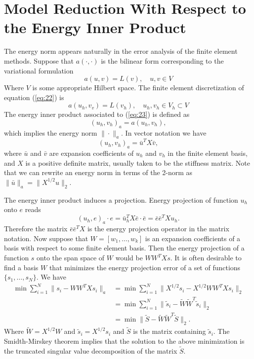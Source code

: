 \documentclass[12pt]{article}
\begin{document}
\section{Model Reduction With Respect to the Energy Inner Product}

The energy norm appears naturally in the error analysis of the finite element methods. Suppose that $a(\cdot,\cdot)$ is the bilinear form corresponding to the variational formulation
\begin{equation} \label{eq:22}
	a(u,v) = L(v), \quad u,v \in V
\end{equation}
Where $V$ is some appropriate Hilbert space. The finite element discretization of equation (\ref{eq:22}) is
\begin{equation} \label{eq:23}
	a(u_h,v_v) = L(v_h), \quad u_h,v_h\in V_h \subset V
\end{equation}
The energy inner product associated to (\ref{eq:23}) is defined as
\begin{equation} \label{eq:24}
	(u_h,v_h)_a = a(u_h,v_h),
\end{equation}
which implies the energy norm $\| \cdot \|_a$. In vector notation we have
\begin{equation} \label{eq:25}
	(u_h,v_h)_a = \bar u^T X \bar v,
\end{equation} 
where $\bar u$ and $\bar v$ are expansion coefficients of $u_h$ and $v_h$ in the finite element basis, and $X$ is a positive definite matrix, usually taken to be the stiffness matrix. Note that we can rewrite an energy norm in terms of the 2-norm as $\| \bar u \|_a = \| X^{1/2} u \|_2$.

The energy inner product induces a projection. Energy projection of function $u_h$ onto $e$ reads
\begin{equation} \label{eq:26}
	(u_h,e)_a \cdot e = \bar u_h^T X \bar e \cdot \bar e = \bar e \bar e^T X u_h. 
\end{equation}
Therefore the matrix $\bar e\bar e^T X$ is the energy projection operator in the matrix notation. Now suppose that $W = [ w_1,\dots,w_k ]$ is an expansion coefficients of a basis with respect to some finite element basis. Then the energy projection of a function $s$ onto the span space of $W$ would be $WW^TXs$. It is often desirable to find a basis $W$ that minimizes the energy projection error of a set of functions $\{s_1,\dots,s_N\}$. We have
\begin{equation} \label{eq:27}
\begin{aligned}
	\min \sum_{i=1}^N \| s_i - WW^TXs_i \|_a &= \min \sum_{i=1}^N \| X^{1/2} s_i - X^{1/2 }WW^TXs_i \|_2 \\
	&= \min \sum_{i=1}^N \| \tilde s_i - \tilde W \tilde W^T\tilde s_i \|_2 \\
	&= \min \| \tilde S - \tilde W \tilde W^T \tilde S \|_2.
\end{aligned}
\end{equation}
Where $\tilde W = X^{1/2} W$ and $\tilde s_i = X^{1/2} s_i$ and $\tilde S$ is the matrix containing $\tilde s_i$. The Smidth-Mirskey theorem implies that the solution to the above minimization is the truncated singular value decomposition of the matrix $\tilde S$.
\end{document}
